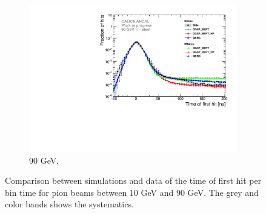 \begin{figure}[htbp!]
\begin{subfigure}[t]{0.5\textwidth}
		\includegraphics[width=1\textwidth]{chap5/fig_AHCAL_timing/Pions/Comparison_SimData_Pion90GeV_LateClusters.pdf}
		\caption{90 GeV.} \label{fig:dNdt_SimData_90GeV}
	\end{subfigure}
	\caption{Comparison between simulations and data of the time of first hit per bin time for pion beams between 10 GeV and 90 GeV. The grey and color bands shows the systematics.}
	\label{fig:dNdt_SimData_Comparison}
\end{figure}

